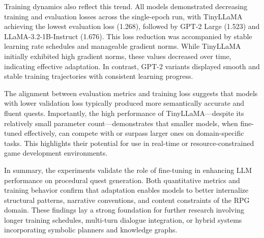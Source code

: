 Training dynamics also reflect this trend. All models demonstrated decreasing training
and evaluation losses across the single-epoch run, with TinyLLaMA achieving the lowest
evaluation loss (1.268), followed by GPT-2 Large (1.523) and LLaMA-3.2-1B-Instruct
(1.676). This loss reduction was accompanied by stable learning rate schedules and manageable
gradient norms. While TinyLLaMA initially exhibited high gradient norms, these
values decreased over time, indicating effective adaptation. In contrast, GPT-2 variants
displayed smooth and stable training trajectories with consistent learning progress.

The alignment between evaluation metrics and training loss suggests that models with
lower validation loss typically produced more semantically accurate and fluent quests.
Importantly, the high performance of TinyLLaMA—despite its relatively small parameter
count—demonstrates that smaller models, when fine-tuned effectively, can compete with
or surpass larger ones on domain-specific tasks. This highlights their potential for use in
real-time or resource-constrained game development environments.

In summary, the experiments validate the role of fine-tuning in enhancing LLM performance
on procedural quest generation. Both quantitative metrics and training behavior
confirm that adaptation enables models to better internalize structural patterns, narrative
conventions, and content constraints of the RPG domain. These findings lay a strong
foundation for further research involving longer training schedules, multi-turn dialogue
integration, or hybrid systems incorporating symbolic planners and knowledge graphs.

\newpage

